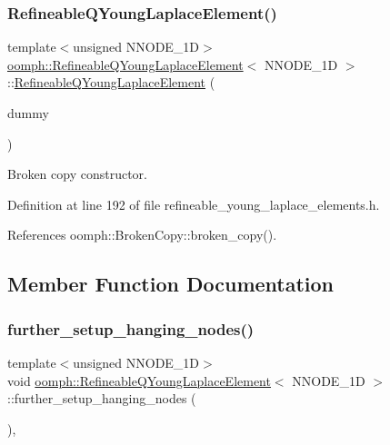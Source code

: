 \subsubsection{\texorpdfstring{Refineable\+Q\+Young\+Laplace\+Element()}{RefineableQYoungLaplaceElement()}\hspace{0.1cm}{\footnotesize\ttfamily [2/2]}}
{\footnotesize\ttfamily template$<$unsigned N\+N\+O\+D\+E\+\_\+1D$>$ \\
\hyperlink{classoomph_1_1RefineableQYoungLaplaceElement}{oomph\+::\+Refineable\+Q\+Young\+Laplace\+Element}$<$ N\+N\+O\+D\+E\+\_\+1D $>$\+::\hyperlink{classoomph_1_1RefineableQYoungLaplaceElement}{Refineable\+Q\+Young\+Laplace\+Element} (\begin{DoxyParamCaption}\item[{const \hyperlink{classoomph_1_1RefineableQYoungLaplaceElement}{Refineable\+Q\+Young\+Laplace\+Element}$<$ N\+N\+O\+D\+E\+\_\+1D $>$ \&}]{dummy }\end{DoxyParamCaption})\hspace{0.3cm}{\ttfamily [inline]}}



Broken copy constructor. 



Definition at line 192 of file refineable\+\_\+young\+\_\+laplace\+\_\+elements.\+h.



References oomph\+::\+Broken\+Copy\+::broken\+\_\+copy().



\subsection{Member Function Documentation}
\mbox{\label{classoomph_1_1RefineableQYoungLaplaceElement_a2bf2a41febf535ba6993e7aafbf769c2}} 
\subsubsection{\texorpdfstring{further\+\_\+setup\+\_\+hanging\+\_\+nodes()}{further\_setup\_hanging\_nodes()}}
{\footnotesize\ttfamily template$<$unsigned N\+N\+O\+D\+E\+\_\+1D$>$ \\
void \hyperlink{classoomph_1_1RefineableQYoungLaplaceElement}{oomph\+::\+Refineable\+Q\+Young\+Laplace\+Element}$<$ N\+N\+O\+D\+E\+\_\+1D $>$\+::further\+\_\+setup\+\_\+hanging\+\_\+nodes (\begin{DoxyParamCaption}{ }\end{DoxyParamCaption})\hspace{0.3cm}{\ttfamily [inline]}, {\ttfamily [virtual]}}



